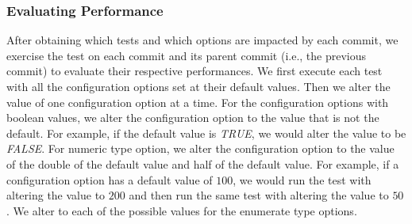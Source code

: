 

\subsubsection{Evaluating Performance}
\label{evaluation}
After obtaining which tests and which options are impacted by each commit, we exercise the test on each commit and its parent commit (i.e., the previous commit) to evaluate their respective performances. %
We first execute each test with all the configuration options set at their default values. Then we alter the value of one configuration option at a time. For the configuration options with boolean values, we alter the configuration option to the value that is not the default. For example, if the default value is \emph{TRUE}, we would alter the value to be \emph{FALSE}. For numeric type option, we alter the configuration option to the value of the double of the default value and half of the default value. For example, if a configuration option has a default value of $100$, we would run the test with altering the value to $200$ and then run the same test with altering the value to $50$. %
We alter to each of the possible values for the enumerate type options. %

